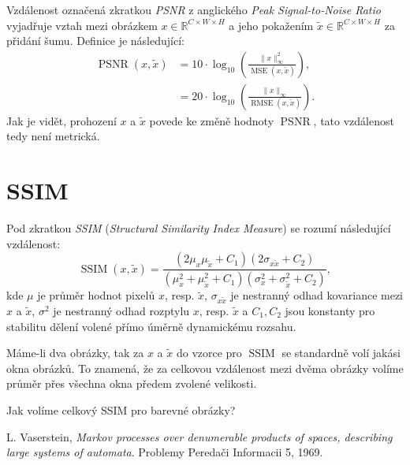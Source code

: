 \documentclass[czech]{article}
\begin{document}
Vzdálenost označená zkratkou \emph{PSNR} z anglického \emph{Peak Signal-to-Noise Ratio}
vyjadřuje vztah mezi obrázkem $x \in \mathbb{R}^{C \times W \times H}$
a jeho pokažením $\tilde{x} \in \mathbb{R}^{C \times W \times H}$ za přidání šumu.
Definice je následující:
\begin{align}
    \operatorname{PSNR}(x, \tilde{x}) &= 10 \cdot \operatorname{log}_{10} \left( \frac{\|x\|_{\infty}^2}{\operatorname{MSE}(x, \tilde{x})} \right), \\
    &= 20 \cdot \operatorname{log}_{10} \left( \frac{\|x\|_{\infty}}{\operatorname{RMSE}(x, \tilde{x})} \right).
\end{align}
Jak je vidět, prohození $x$ a $\tilde{x}$ povede ke změně hodnoty $\operatorname{PSNR}$, tato vzdálenost tedy není metrická.

\section{SSIM}

Pod zkratkou \emph{SSIM} (\emph{Structural Similarity Index Measure})
se rozumí následující vzdálenost:
\begin{equation}
    \operatorname{SSIM}(x, \tilde{x}) = \frac{(2 \mu_x \mu_{\tilde{x}} + C_1)(2 \sigma_{x \tilde{x}} + C_2)}{(\mu_x^2 + \mu_{\tilde{x}}^2 + C_1)(\sigma_x^2 + \sigma_{\tilde{x}}^2 + C_2)},
\end{equation}
kde $\mu$ je průměr hodnot pixelů $x$, resp. $\tilde{x}$,
$\sigma_{x \tilde{x}}$ je nestranný odhad kovariance mezi $x$ a $\tilde{x}$,
$\sigma^2$ je nestranný odhad rozptylu $x$, resp. $\tilde{x}$
a $C_1, C_2$ jsou konstanty pro stabilitu dělení volené přímo úměrně dynamickému rozsahu.

Máme-li dva obrázky, tak za $x$ a $\tilde{x}$ do vzorce pro $\operatorname{SSIM}$ se standardně volí jakási okna obrázků.
To znamená, že za celkovou vzdálenost mezi dvěma obrázky volíme průměr přes všechna okna předem zvolené velikosti.

Jak volíme celkový SSIM pro barevné obrázky?

\begin{thebibliography}{1}

 L. Vaserstein,
\emph{Markov processes over denumerable products of spaces, describing large systems of automata}.
Problemy Peredači Informacii 5, 1969.

\end{thebibliography}
\end{document}
